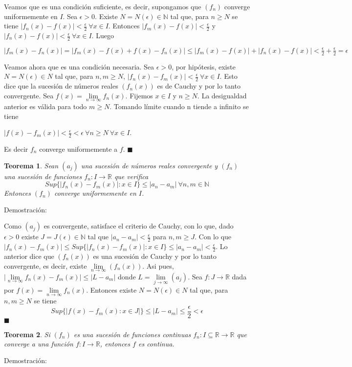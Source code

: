 \documentclass[12pt]{book}
\newcommand\R{{\mathbb R}}
\newcommand\N{{\mathbb N}}
\providecommand{\abs}[1]{\lvert#1\rvert}
\newtheorem{teo}{Teorema}[section]
\begin{document}
Veamos que es una condición suficiente, es decir, supongamos que $(f_n)$ converge uniformemente en $I$.
Sea $\epsilon>0$. Existe $N=N(\epsilon) \in \N$ tal que, para $n \ge N$ se tiene $\abs{f_n(x)-f(x)}<\frac{\epsilon}{2} \ \forall{x \in I}$. Entonces $\abs{f_m(x)-f(x)}<\frac{\epsilon}{2}$ y $\abs{f_n(x)-f(x)}<\frac{\epsilon}{2} \ \forall{x \in I}$. Luego 

$\abs{f_m(x)-f_n(x)}=\abs{f_m(x)-f(x)+f(x)-f_n(x)} \le \abs{f_m(x)-f(x)}+\abs{f_n(x)-f(x)}<\frac{\epsilon}{2}+\frac{\epsilon}{2}=\epsilon$

Veamos ahora que es una condición necesaria.
Sea $\epsilon>0$, por hipótesis, existe $N=N(\epsilon) \in N$ tal que, para $n,m \ge N$, $\abs{f_n(x)-f_m(x)}<\frac{\epsilon}{2} \ \forall{x \in I}$. Esto dice que la sucesión de números reales $(f_n(x))$ es de Cauchy y por lo tanto convergente. Sea $f(x)=\lim\limits_{n\to\infty}f_n(x)$. Fijemos $x \in I$ y $n \ge N$. La desigualdad anterior es válida para todo $m \ge N$. Tomando límite cuando n tiende a infinito se tiene

$\abs{f(x)-f_m(x)}<\frac{\epsilon}{2}<\epsilon \ \forall{n \ge N} \ \forall{x \in I}$.

Es decir $f_n$ converge uniformemente a $f$. $\blacksquare$
\begin{teo}\rm
Sean $(a_j)$ una sucesión de números reales convergente y $(f_n)$ una sucesión de funciones $f_n:I \rightarrow \R$ que verifica
$$Sup\{\abs{f_n(x)-f_m(x)}:x \in I\} \le \abs{a_n-a_m} \ \forall{n,m \in \N}$$
Entonces $(f_n)$ converge uniformemente en $I$.
\end{teo}
Demostración:

Como $(a_j)$ es convergente, satisface el criterio de Cauchy, con lo que, dado $\epsilon>0$ existe $J=J(\epsilon) \in \N$ tal que $\abs{a_n-a_m}<\frac{\epsilon}{2}$ para $n,m \ge J$. Con lo que $\abs{f_n(x)-f_m(x)} \le Sup\{\abs{f_n(x)-f_m(x)}:x \in I\} \le \abs{a_n-a_m}<\frac{\epsilon}{2}$.
Lo anterior dice que $(f_n(x))$ es una sucesión de Cauchy y por lo tanto convergente, es decir, existe $\lim\limits_{n\to\infty}(f_n(x))$. Asi pues, $\abs{\lim\limits_{n\to\infty}f_n(x)-f_m(x)} \le \abs{L-a_m}$ donde $L=\lim\limits_{j\to\infty}(a_j)$.
Sea $f:J \rightarrow \R$ dada por $f(x)=\lim\limits_{n\to\infty}f_n(x)$. Entonces existe $N=N(\epsilon) \in N$ tal que, para $n,m \ge N$ se tiene 
$$Sup\{\abs{f(x)-f_m(x) : x \in J}\} \le \abs{L-a_m} \le \frac{\epsilon}{2}<\epsilon$$ $\blacksquare$
\begin{teo}\rm
Si $(f_n)$ es una sucesión de funciones continuas $f_n: I \subseteq{\R} \rightarrow \R$ que converge a una función $f:I \rightarrow \R$, entonces $f$ es continua.
\end{teo}
Demostración:
\end{document}
